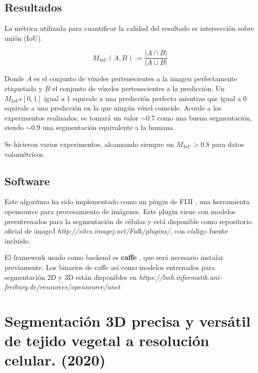\subsection{Resultados}\label{app1_results}


La métrica utilizada para cuantificar la calidad del resultado es intersección sobre unión (IoU).

\begin{equation}
M_{IoU}(A, B) := \frac{|A\cap B|}{|A\cup B|}
\end{equation}

Donde $A$ es el conjunto de vóxeles pertenecientes a la imagen perfectamente etiquetada y $B$ el conjunto de vóxeles pertenecientes a la predicción. Un $M_{IoU}\epsilon[0,1]$ igual a 1 equivale a una predicción perfecta mientras que igual a 0 equivale a una predicción en la que ningún vóxel coincide.
Acorde a los experimentos realizados, se tomará un valor $\sim0.7$ como una buena segmentación, siendo $\sim0.9$ una segmentación equivalente a la humana.

Se hicieron varios experimentos, alcanzando siempre un $M_{IoU}>0.8$ para datos volumétricos.

\subsection{Software}\label{app1_software}

Este algoritmo ha sido implementado como un plugin de FIJI \cite{Schindelin2012}, una herramienta opensource para procesamiento de imágenes. Este plugin viene con modelos preentrenados para la segmentación de células y está disponible como repositorio oficial de imageJ \textit{http://sites.imagej.net/Falk/plugins/}, con código fuente incluido.

El framework usado como backend es \textbf{caffe} \cite{Jia2014}, que será necesario instalar previamente. Los binarios de caffe así como modelos entrenados para segmentación 2D y 3D están disponibles en \textit{https://lmb.informatik.uni-freiburg.de/resources/opensource/unet}

\section{Segmentación 3D precisa y versátil de tejido vegetal a resolución celular. (2020)}\label{sec:app2}



